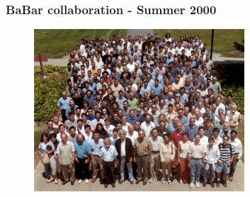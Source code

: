 \begin{frame}
\frametitle{BaBar collaboration - Summer 2000}

\begin{figure}[htbp]
\begin{center}
\includegraphics[width=0.7\textwidth]{images/babar-summer-2000.png}
\end{center}
\end{figure}


\end{frame}


